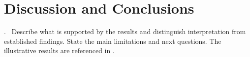 \section{Discussion and Conclusions}
\label{sec:conclusions}
\begin{block}{\thesection.\ \insertsectionhead}
Describe what is supported by the results and distinguish interpretation from
established findings. State the main limitations and next questions.
The illustrative results are referenced in .
\end{block}
